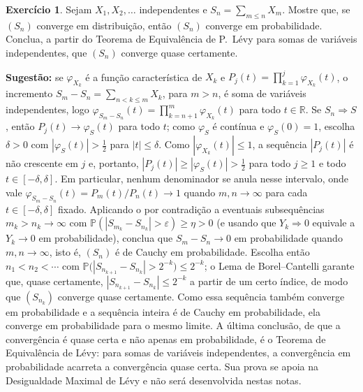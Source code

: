 \documentclass[12pt,portuguese]{article}
\theoremstyle{definition}
\theoremstyle{plainexercise}
\theoremstyle{starredexercise}
\newtheorem{starredexercise}[exercise]{Exercício}
\theoremstyle{definition}
\begin{document}
\begin{starredexercise}\label{exercise:serie-converge-dist}
Sejam $X_1,X_2,\dots$ independentes e $S_n=\sum_{m\leqslant n}X_m$. Mostre
que, se $(S_n)$ converge em distribuição, então $(S_n)$ converge em
probabilidade. Conclua, a partir do Teorema de Equivalência de P.~Lévy para
somas de variáveis independentes, que $(S_n)$ converge quase certamente.

\noindent\textbf{Sugestão:} se $\varphi_{X_k}$ é a função característica de
$X_k$ e $P_j(t)=\prod_{k=1}^{j}\varphi_{X_k}(t)$, o incremento
$S_m-S_n=\sum_{n<k\leqslant m}X_k$, para $m>n$, é soma de variáveis
independentes, logo $\varphi_{S_m-S_n}(t)=\prod_{k=n+1}^{m}\varphi_{X_k}(t)$
para todo $t\in\mathbb{R}$. Se $S_n\Rightarrow S$, então
$P_j(t)\to\varphi_S(t)$ para todo $t$; como $\varphi_S$ é contínua e
$\varphi_S(0)=1$, escolha $\delta>0$ com $|\varphi_S(t)|>\frac12$ para
$|t|\leqslant\delta$. Como $|\varphi_{X_k}(t)|\leqslant1$, a sequência
$|P_j(t)|$ é não crescente em $j$ e, portanto,
$|P_j(t)|\geqslant|\varphi_S(t)|>\frac12$ para todo $j\geqslant1$ e todo
$t\in[-\delta,\delta]$. Em particular, nenhum denominador se anula nesse
intervalo, onde vale $\varphi_{S_m-S_n}(t)=P_m(t)/P_n(t)\to1$ quando
$m,n\to\infty$ para cada $t\in[-\delta,\delta]$ fixado. Aplicando o
 por contradição a eventuais
subsequências $m_k>n_k\to\infty$ com
$\mathbb{P}(|S_{m_k}-S_{n_k}|>\varepsilon)\geqslant\eta>0$ (e usando que
$Y_k\Rightarrow0$ equivale a $Y_k\to0$ em probabilidade), conclua que
$S_m-S_n\to0$ em probabilidade quando $m,n\to\infty$, isto é, $(S_n)$ é de
Cauchy em probabilidade. Escolha então $n_1<n_2<\cdots$ com
$\mathbb{P}\bigl(|S_{n_{k+1}}-S_{n_k}|>2^{-k}\bigr)\leqslant2^{-k}$; o Lema de
Borel--Cantelli garante que, quase certamente, $|S_{n_{k+1}}-S_{n_k}|\leqslant
2^{-k}$ a partir de um certo índice, de modo que $(S_{n_k})$ converge quase
certamente. Como essa sequência também converge em probabilidade e a sequência
inteira é de Cauchy em probabilidade, ela converge em probabilidade para o mesmo
limite. A última conclusão, de que a convergência é quase certa e não apenas em
probabilidade, é o Teorema de Equivalência de Lévy: para somas de variáveis
independentes, a convergência em probabilidade acarreta a convergência quase
certa. Sua prova se apoia na Desigualdade Maximal de Lévy e não será
desenvolvida nestas notas.
\end{starredexercise}



\end{document}
